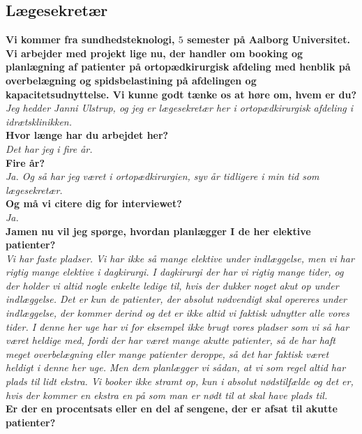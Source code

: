 \clearpage
\subsection{Lægesekretær} \label{bilagsek}
\textbf{Vi kommer fra sundhedsteknologi, $5$ semester på Aalborg Universitet. Vi arbejder med projekt lige nu, der handler om booking og planlægning af patienter på ortopædkirurgisk afdeling med henblik på overbelægning og spidsbelastining på afdelingen og kapacitetsudnyttelse. Vi kunne godt tænke os at høre om, hvem er du?}\\
\noindent
\textit{Jeg hedder Janni Ulstrup, og jeg er lægesekretær her i ortopædkirurgisk afdeling i idrætsklinikken.} \\
\noindent
\textbf{Hvor længe har du arbejdet her?} \\
\noindent
\textit{Det har jeg i fire år.} \\
\noindent
\textbf{Fire år?} \\
\noindent
\textit{Ja. Og så har jeg været i ortopædkirurgien, syv år tidligere i min tid som lægesekretær.} \\
\noindent
\textbf{Og må vi citere dig for interviewet?}\\
\noindent
\textit{Ja.} \\
\noindent
\textbf{Jamen nu vil jeg spørge, hvordan planlægger I de her elektive patienter?}\\
\noindent
\textit{Vi har faste pladser. Vi har ikke så mange elektive under indlæggelse, men vi har rigtig mange elektive i dagkirurgi. I dagkirurgi der har vi rigtig mange tider, og der holder vi altid nogle enkelte ledige til, hvis der dukker noget akut op under indlæggelse. Det er kun de patienter, der absolut nødvendigt skal opereres under indlæggelse, der kommer derind og det er ikke altid vi faktisk udnytter alle vores tider. I denne her uge har vi for eksempel ikke brugt vores pladser som vi så har været heldige med, fordi der har været mange akutte patienter, så de har haft meget overbelægning eller mange patienter deroppe, så det har faktisk været heldigt i denne her uge. Men dem planlægger vi sådan, at vi som regel altid har plads til lidt ekstra. Vi booker ikke stramt op, kun i absolut nødstilfælde og det er, hvis der kommer en ekstra en på som man er nødt til at skal have plads til.}\\
\textbf{Er der en procentsats eller en del af sengene, der er afsat til akutte patienter?}\\
\noindent
